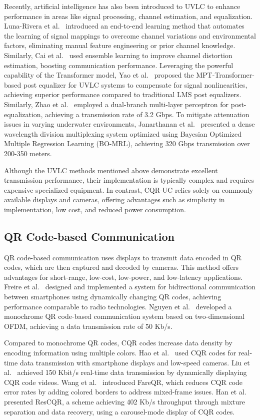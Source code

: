 \documentclass[preprint,12pt]{elsarticle}
\begin{document}
Recently, artificial intelligence has also been introduced to UVLC to enhance performance in areas like signal processing, channel estimation, and equalization. Luna-Rivera et al.~\cite{Luna2024Enhancing} introduced an end-to-end learning method that automates the learning of signal mappings to overcome channel variations and environmental factors, eliminating manual feature engineering or prior channel knowledge. Similarly, Cai et al.~\cite{jifan2023Machine} used ensemble learning to improve channel distortion estimation, boosting communication performance. Leveraging the powerful capability of the Transformer model, Yao et al.~\cite{yao2023Training} proposed the MPT-Transformer-based post equalizer for UVLC systems to compensate for signal nonlinearities, achieving superior performance compared to traditional LMS post equalizers. Similarly, Zhao et al.~\cite{zhao2020underwater} employed a dual-branch multi-layer perceptron for post-equalization, achieving a transmission rate of 3.2 Gbps. To mitigate attenuation issues in varying underwater environments, Janarthanan et al.~\cite{Janarthanan2024} presented a dense wavelength division multiplexing system optimized using Bayesian Optimized Multiple Regression Learning (BO-MRL), achieving 320 Gbps transmission over 200-350 meters.

Although the UVLC methods mentioned above demonstrate excellent transmission performance, their implementation is typically complex and requires expensive specialized equipment. In contrast, CQR-UC relies solely on commonly available displays and cameras, offering advantages such as simplicity in implementation, low cost, and reduced power consumption.

\subsection{QR Code-based Communication}
QR code-based communication uses displays to transmit data encoded in QR codes, which are then captured and decoded by cameras. This method offers advantages for short-range, low-cost, low-power, and low-latency applications. 
Freire et al.~\cite{freire2016reliable} designed and implemented a system for bidirectional communication between smartphones using dynamically changing QR codes, achieving performance comparable to radio technologies. 
Nguyen et al.~\cite{nguyen2019OFDM} developed a monochrome QR code-based communication system based on two-dimensional OFDM, achieving a data transmission rate of 50 Kb/s. 

Compared to monochrome QR codes, CQR codes increase data density by encoding information using multiple colors.
Hao et al.~\cite{hao2012visible} used CQR codes for real-time data transmission with smartphone displays and low-speed cameras.
Liu et al.~\cite{Liu2020screen-camera} achieved 150 Kbit/s real-time data transmission by dynamically displaying CQR code videos. 
Wang et al.~\cite{wang2020fareqr} introduced FareQR, which reduces CQR code error rates by adding colored borders to address mixed-frame issues. 
Han et al.~\cite{han2023rescqr} presented ResCQR, a scheme achieving 402 Kb/s throughput through mixture separation and data recovery, using a carousel-mode display of CQR codes.
\end{document}
